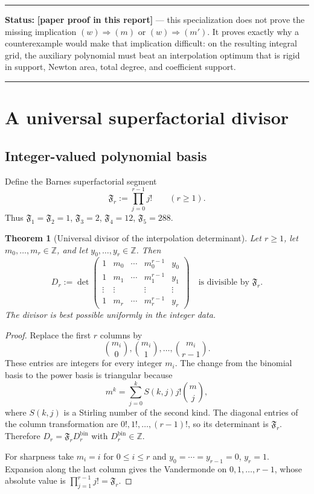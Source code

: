 \documentclass[11pt,oneside]{article}
\newtheorem{theorem}{Theorem}[section]
\theoremstyle{definition}
\theoremstyle{remark}
\newcommand{\Z}{\mathbb Z}
\newcommand{\statusnew}{\textcolor{newgreen}{\textbf{[paper proof in this report]}}}
\newcommand{\SF}[1]{\mathfrak F_{#1}}
\newenvironment{statusbox}[1]
{\begin{center}\begin{minipage}{0.94\textwidth}\raggedright\hbadness=10000\hrule
\vspace{0.45em}\textbf{Status:} #1\par\vspace{0.35em}}
{\vspace{0.35em}\hrule\end{minipage}\end{center}}
\begin{document}
\begin{statusbox}{\statusnew{} --- this specialization does not prove the missing implication
$(w)\Rightarrow(m)$ or $(w)\Rightarrow(m')$.  It proves exactly why a counterexample would
make that implication difficult: on the resulting integral grid, the auxiliary polynomial
must beat an interpolation optimum that is rigid in support, Newton area, total degree, and
coefficient support.}
\end{statusbox}

\section{A universal superfactorial divisor}
\label{sec:superfactorial}

\subsection{Integer-valued polynomial basis}

Define the Barnes superfactorial segment
\begin{equation}
 \SF{r}:=\prod_{j=0}^{r-1}j!
 \qquad(r\ge1).
 \label{c3:eq-superfactorial}
\end{equation}
Thus $\SF{1}=\SF{2}=1$, $\SF{3}=2$, $\SF{4}=12$, $\SF{5}=288$.

\begin{theorem}[Universal divisor of the interpolation determinant]
\label{c3:thm-superfactorial-divisor}
Let $r\ge1$, let $m_0,\ldots,m_r\in\Z$, and let $y_0,\ldots,y_r\in\Z$.  Then
\begin{equation}
 D_r:=\det
 \begin{pmatrix}
  1&m_0&\cdots&m_0^{r-1}&y_0\\
  1&m_1&\cdots&m_1^{r-1}&y_1\\
  \vdots&\vdots&&\vdots&\vdots\\
  1&m_r&\cdots&m_r^{r-1}&y_r
 \end{pmatrix}
 \quad\text{is divisible by }\SF{r}.
 \label{c3:eq-D-divisible}
\end{equation}
The divisor is best possible uniformly in the integer data.
\end{theorem}

\begin{proof}
Replace the first $r$ columns by
\[
 \binom{m_i}{0},\binom{m_i}{1},\ldots,\binom{m_i}{r-1}.
\]
These entries are integers for every integer $m_i$.  The change from the binomial basis to the
power basis is triangular because
\[
 m^k=\sum_{j=0}^{k}S(k,j)j!\binom mj,
\]
where $S(k,j)$ is a Stirling number of the second kind.  The diagonal entries of the column
transformation are $0!,1!,\ldots,(r-1)!$, so its determinant is $\SF{r}$.  Therefore
$D_r=\SF{r}D_r^{\mathrm{bin}}$ with $D_r^{\mathrm{bin}}\in\Z$.

For sharpness take $m_i=i$ for $0\le i\le r$ and
$y_0=\cdots=y_{r-1}=0$, $y_r=1$.  Expansion along the last column gives the Vandermonde on
$0,1,\ldots,r-1$, whose absolute value is
$\prod_{j=1}^{r-1}j!=\SF{r}$.
\end{proof}
\end{document}
